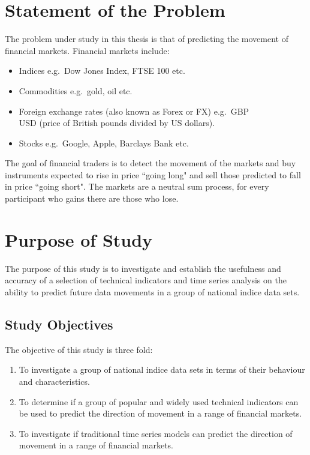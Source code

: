 

\section{Statement of the Problem}
The problem under study in this thesis is that of predicting the movement of financial markets. Financial markets include:
\begin{itemize}
\item Indices e.g.\ Dow Jones Index, FTSE 100 etc.
\item Commodities e.g.\ gold, oil etc.
\item Foreign exchange rates (also known as Forex or FX) e.g.\ GBP\\USD (price of British pounds divided by US dollars).
\item Stocks e.g.\ Google, Apple, Barclays Bank etc.
\end{itemize}
The goal of financial traders is to detect the movement of the markets and buy instruments expected to rise in price \textquotedblleft going long" and sell those predicted to fall in price \textquotedblleft going short". The markets are a neutral sum process, for every participant who gains there are those who lose.

\section{Purpose of Study}
The purpose of this study is to investigate and establish the usefulness and accuracy of a selection of technical indicators and time series analysis on the ability to predict future data movements in a group of national indice data sets.

\subsection{Study Objectives}
The objective of this study is three fold:

\begin{enumerate}
\item To investigate a group of national indice data sets in terms of their behaviour and characteristics.
\item To determine if a group of popular and widely used technical indicators can be used to predict the direction of movement in a range of financial markets.
\item To investigate if traditional time series models can predict the direction of movement in a range of financial markets.
\end{enumerate}

